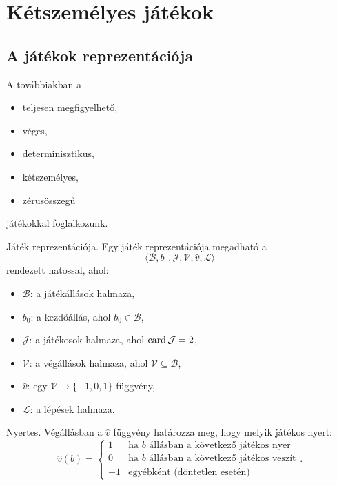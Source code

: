 \section{Kétszemélyes játékok}

\subsection{A játékok reprezentációja}

A továbbiakban a
\begin{itemize}
    \item teljesen megfigyelhető,
    \item véges,
    \item determinisztikus,
    \item kétszemélyes,
    \item zérusösszegű
\end{itemize}
játékokkal foglalkozunk.

\begin{definicio}
    Játék reprezentációja.
    Egy játék reprezentációja megadható a
    \[
        \langle
        \mathcal{B},
        b_0,
        \mathcal{J},
        \mathcal{V},
        \hat{v},
        \mathcal{L}
        \rangle
    \]
    rendezett hatossal, ahol:
    \begin{itemize}
        \item $\mathcal{B}$: a játékállások halmaza,
        \item $b_0$: a kezdőállás, ahol $b_0 \in \mathcal{B}$,
        \item $\mathcal{J}$: a játékosok halmaza, ahol $\operatorname{card} \mathcal{J} = 2$,
        \item $\mathcal{V}$: a végállások halmaza, ahol $\mathcal{V} \subseteq
            \mathcal{B}$,
        \item $\hat{v}$: egy $\mathcal{V} \to \{-1, 0, 1\} $
            függvény,
        \item $\mathcal{L}$: a lépések halmaza.
    \end{itemize}
\end{definicio}

\begin{definicio}
    Nyertes.
    Végállásban a $\hat{v}$ függvény határozza meg, hogy melyik
    játékos nyert:
     \[
        \hat{v}(b) =
        \begin{cases}
            1 & \text{ha $b$ állásban a következő játékos nyer} \\
            0 & \text{ha $b$ állásban a következő játékos veszít} \\
            -1 & \text{egyébként (döntetlen esetén)}
        \end{cases}
    .\]
\end{definicio}

